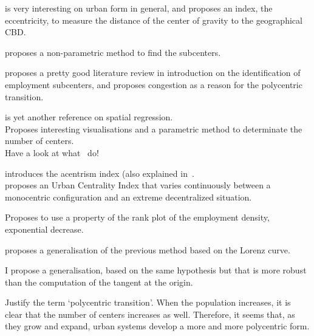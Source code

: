 \cite{Bertaud:2001} is very interesting on urban form in general, and proposes
an index, the eccentricity, to measure the distance of the center of gravity to
the geographical CBD.


\cite{McMillen:2001} proposes a non-parametric method to find the subcenters.

\cite{McMillen:2003} proposes a pretty good literature review in introduction on
the identification of employment subcenters, and proposes congestion as a reason
for the polycentric transition.


\cite{Griffith:2007} is yet another reference on spatial regression.\\

\cite{Redfearn:2007} Proposes interesting visualisations and a parametric method
to determinate the number of centers.\\

Have a look at what~\cite{Berroir:2008} do!


\cite{LeNechet:2010} introduces the acentrism index (also explained
in~\cite{LeNechet:2015}.\\

\cite{Pereira:2013} proposes an Urban Centrality Index that varies continuously
between a monocentric configuration and an extreme decentralized situation.

\cite{Louf:2013_polycentric} Proposes to use a property of the rank plot of the
employment density, exponential decrease.

\cite{Louail:2014} proposes a generalisation of the previous method based on the
Lorenz curve.

I propose a generalisation, based on the same hypothesis but that is more robust
than the computation of the tangent at the origin.

Justify the term `polycentric transition'. When the population increases, it is
clear that the number of centers increases as well. Therefore, it seems that, as
they grow and expand, urban systems develop a more and more polycentric form.
